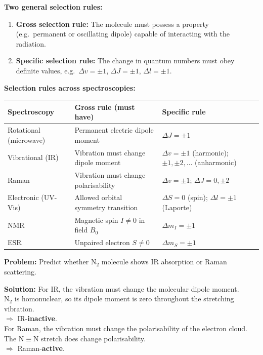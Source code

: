 \documentclass[12pt,a4paper]{article}
\begin{document}
\textbf{Two general selection rules:}
\begin{enumerate}[leftmargin=*, itemsep=2pt, topsep=2pt]
  \item \textbf{Gross selection rule:} The molecule must possess a property (e.g.\ permanent or oscillating dipole) capable of interacting with the radiation.
  \item \textbf{Specific selection rule:} The change in quantum numbers must obey definite values, e.g.\ $\Delta v = \pm 1$, $\Delta J = \pm 1$, $\Delta l = \pm 1$.
\end{enumerate}

\textbf{Selection rules across spectroscopies:}\par\noindent
\begin{tabularx}{\linewidth}{|B{2.8cm}|Y|Y|}
\hline
\textbf{Spectroscopy} & \textbf{Gross rule (must have)} & \textbf{Specific rule} \\
\hline
Rotational (microwave) & Permanent electric dipole moment & $\Delta J=\pm 1$ \\
\hline
Vibrational (IR) & Vibration must change dipole moment & $\Delta v=\pm 1$ (harmonic); $\pm 1, \pm 2,\ldots$ (anharmonic) \\
\hline
Raman & Vibration must change polarisability & $\Delta v=\pm 1$; $\Delta J=0,\pm 2$ \\
\hline
Electronic (UV-Vis) & Allowed orbital symmetry transition & $\Delta S=0$ (spin); $\Delta l=\pm 1$ (Laporte) \\
\hline
NMR & Magnetic spin $I\neq 0$ in field $B_0$ & $\Delta m_I=\pm 1$ \\
\hline
ESR & Unpaired electron $S\neq 0$ & $\Delta m_S=\pm 1$ \\
\hline
\end{tabularx}

\begin{tcolorbox}[examplebox, title={Solved Example: Why \texorpdfstring{$\mathrm{N_2}$}{N2} Shows No IR but Shows Raman}]
\textbf{Problem:} Predict whether $\mathrm{N_2}$ molecule shows IR absorption or Raman scattering.

\textbf{Solution:} For IR, the vibration must change the molecular dipole moment.\\
$\mathrm{N_2}$ is homonuclear, so its dipole moment is zero throughout the stretching vibration. \\$\Rightarrow$ IR-\textbf{inactive}.\\
For Raman, the vibration must change the polarisability of the electron cloud. The $\mathrm{N{\equiv}N}$ stretch does change polarisability. \\$\Rightarrow$ Raman-\textbf{active}.
\end{tcolorbox}
\end{document}
